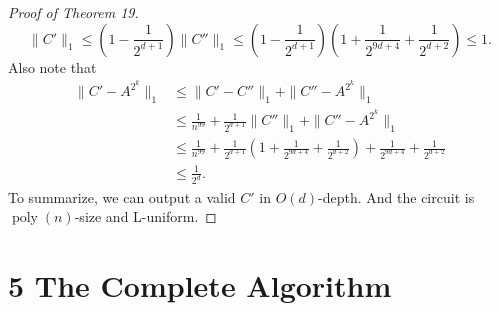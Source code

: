 \begin{proof}[Proof of Theorem 19]
\[\|C'\|_1\le\left(1-\frac1{2^{d+1}}\right)\|C''\|_1\le\left(1-\frac1{2^{d+1}}\right)\left(1+\frac1{2^{9d+4}}+\frac1{2^{d+2}}\right)\le1.\]
Also note that
\begin{align*}\|C'-A^{2^k}\|_1&\le\|C'-C''\|_1+\|C''-A^{2^k}\|_1\\&\le\frac1{n^{99}}+\frac1{2^{d+1}}\|C''\|_1+\|C''-A^{2^k}\|_1\\&\le\frac1{n^{99}}+\frac1{2^{d+1}}\left(1+\frac1{2^{9d+4}}+\frac1{2^{d+2}}\right)+\frac1{2^{9d+4}}+\frac1{2^{d+2}}\\&\le\frac1{2^d}.\end{align*}
To summarize, we can output a valid $C'$ in $O(d)$-depth. And the circuit is $\operatorname{poly}(n)$-size and L-uniform.
\end{proof}
\section*{5 The Complete Algorithm}

